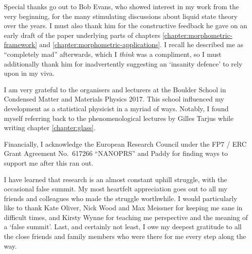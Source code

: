 Special thanks go out to Bob Evans, who showed interest in my work from the very beginning, for the many stimulating discussions about liquid state theory over the years.
I must also thank him for the constructive feedback he gave on an early draft of the paper underlying parts of chapters \ref{chapter:morphometric-framework} and \ref{chapter:morphometric-applications}.
I recall he described me as ``completely mad'' afterwards, which I \emph{think} was a compliment, so I must additionally thank him for inadvertently suggesting an `insanity defence' to rely upon in my viva.

I am very grateful to the organisers and lecturers at the Boulder School in Condensed Matter and Materials Physics 2017.
This school influenced my development as a statistical physicist in a myriad of ways.
Notably, I found myself referring back to the phenomenological lectures by Gilles Tarjus while writing chapter \ref{chapter:glass}.

Financially, I acknowledge the European Research Council under the FP7 / ERC Grant Agreement No.\ 617266 ``NANOPRS'' and Paddy for finding ways to support me after this ran out.

I have learned that research is an almost constant uphill struggle, with the occasional false summit.
My most heartfelt appreciation goes out to all my friends and colleagues who made the struggle worthwhile.
I would particularly like to thank Kate Oliver, Nick Wood and Max Meissner for keeping me sane in difficult times, and Kirsty Wynne for teaching me perspective and the meaning of a `false summit'.
Last, and certainly not least, I owe my deepest gratitude to all the close friends and family members who were there for me every step along the way.

